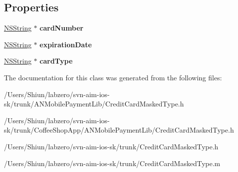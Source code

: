 \subsection*{Properties}
\begin{DoxyCompactItemize}
\item 
\hypertarget{interface_credit_card_masked_type_a896574645e44e8ceeb084865a73dbb62}{
\hyperlink{class_n_s_string}{NSString} $\ast$ {\bfseries cardNumber}}
\label{interface_credit_card_masked_type_a896574645e44e8ceeb084865a73dbb62}

\item 
\hypertarget{interface_credit_card_masked_type_a739aa9b66f72a3f58c76744bbccd31dc}{
\hyperlink{class_n_s_string}{NSString} $\ast$ {\bfseries expirationDate}}
\label{interface_credit_card_masked_type_a739aa9b66f72a3f58c76744bbccd31dc}

\item 
\hypertarget{interface_credit_card_masked_type_a0209bf26e96ffeafca912cc8e371d542}{
\hyperlink{class_n_s_string}{NSString} $\ast$ {\bfseries cardType}}
\label{interface_credit_card_masked_type_a0209bf26e96ffeafca912cc8e371d542}

\end{DoxyCompactItemize}


The documentation for this class was generated from the following files:\begin{DoxyCompactItemize}
\item 
/Users/Shiun/labzero/svn-\/aim-\/ios-\/sk/trunk/ANMobilePaymentLib/CreditCardMaskedType.h\item 
/Users/Shiun/labzero/svn-\/aim-\/ios-\/sk/trunk/CoffeeShopApp/ANMobilePaymentLib/CreditCardMaskedType.h\item 
/Users/Shiun/labzero/svn-\/aim-\/ios-\/sk/trunk/CreditCardMaskedType.h\item 
/Users/Shiun/labzero/svn-\/aim-\/ios-\/sk/trunk/CreditCardMaskedType.m\end{DoxyCompactItemize}

